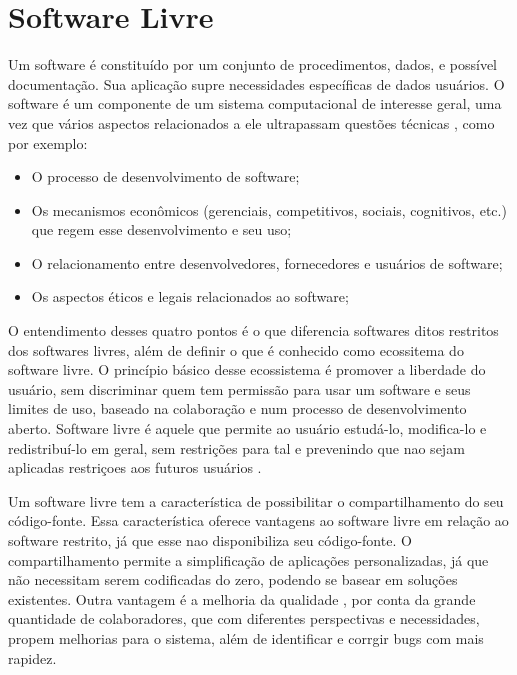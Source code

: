 \chapter{Software Livre}



Um software é constituído por um conjunto de procedimentos, dados, e possível documentação. Sua aplicação supre necessidades específicas de dados usuários. O software é um componente de um sistema computacional de interesse geral, uma vez que vários aspectos relacionados a ele ultrapassam questões técnicas \cite{meirelles2013metrics}, como por exemplo: 

\begin{itemize}
\item O processo de desenvolvimento de software;
\item Os mecanismos econômicos (gerenciais, competitivos, sociais, cognitivos, etc.) que regem esse desenvolvimento e seu uso;
\item O relacionamento entre desenvolvedores, fornecedores e usuários de software;
\item Os aspectos éticos e legais relacionados ao software;
\end{itemize}

O entendimento desses quatro pontos é o que diferencia softwares ditos restritos dos softwares livres, além de definir o que é conhecido como ecossitema do software livre. O princípio básico desse ecossistema é promover a liberdade do usuário, sem discriminar quem tem permissão para usar um software e seus limites de uso, baseado na colaboração e num processo de desenvolvimento aberto. Software livre é aquele que permite ao usuário estudá-lo, modifica-lo e redistribuí-lo em geral, sem restrições para tal e prevenindo que nao sejam aplicadas restriçoes aos futuros usuários \cite{meirelles2013metrics}.

Um software livre tem a característica de possibilitar o compartilhamento do seu código-fonte. Essa característica oferece vantagens ao software livre em relação ao software restrito, já que esse nao disponibiliza seu código-fonte. O compartilhamento permite a simplificação de aplicações personalizadas, já que não necessitam serem codificadas do zero, podendo se basear em soluções existentes. Outra vantagem é a melhoria da qualidade \cite{Raymond, 1999}, por conta da grande quantidade de colaboradores, que com diferentes perspectivas e necessidades, propem melhorias para o sistema, além de identificar e corrgir bugs com mais rapidez.

